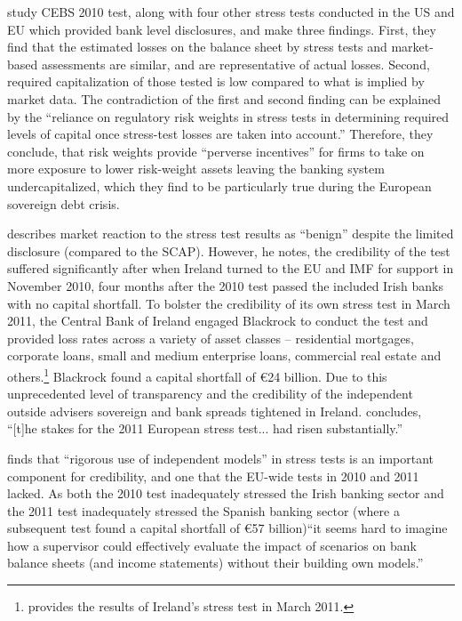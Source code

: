 \documentclass[12pt]{article}
\begin{document}
\citet{Engle} study CEBS 2010 test, along with four other stress tests conducted in the US and EU which provided bank level disclosures, and make three findings. First, they find that the estimated losses on the balance sheet by stress tests and market-based assessments are similar, and are representative of actual losses. Second, required capitalization of those tested is low compared to what is implied by market data. The contradiction of the first and second finding can be explained by the ``reliance on regulatory risk weights in stress tests in determining required levels of capital once stress-test losses are taken into account.'' Therefore, they conclude, that risk weights provide ``perverse incentives'' for firms to take on more exposure to lower risk-weight assets leaving the banking system undercapitalized, which they find to be particularly true during the European sovereign debt crisis.

\citet{Schuermann2011} describes market reaction to the stress test results as ``benign'' despite the limited disclosure (compared to the SCAP). However, he notes, the credibility of the test suffered significantly after when Ireland turned to the EU and IMF for support in November 2010, four months after the 2010 test passed the included Irish banks with no capital shortfall. To bolster the credibility of its own stress test in March 2011, the Central Bank of Ireland engaged Blackrock to conduct the test and provided loss rates across a variety of asset classes -- residential mortgages, corporate loans, small and medium enterprise loans, commercial real estate and others.\footnote{\citet{Ireland} provides the results of Ireland's stress test in March 2011.} Blackrock found a capital shortfall of \euro{24} billion. Due to this unprecedented level of transparency and the credibility of the independent outside advisers sovereign and bank spreads tightened in Ireland. \citet{Schuermann2011} concludes, ``[t]he stakes for the 2011 European stress test... had risen substantially.''

\citet{Schuermann2016} finds that ``rigorous use of independent models'' in stress tests is an important component for credibility, and one that the EU-wide tests in 2010 and 2011 lacked. As both the 2010 test inadequately stressed the Irish banking sector and the 2011 test inadequately stressed the Spanish banking sector (where a subsequent test found a capital shortfall of \euro{57} billion)``it seems hard to imagine how a supervisor could effectively evaluate the impact of scenarios on bank balance sheets (and income statements) without their building own models.''
\end{document}
